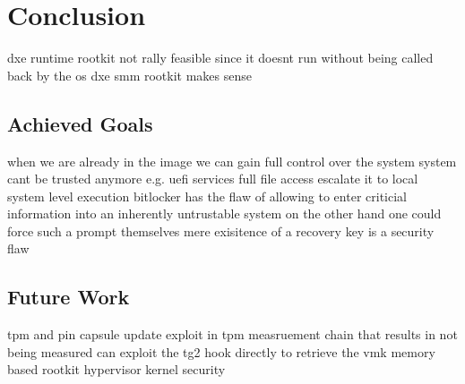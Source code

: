 
\chapter{Conclusion}

dxe runtime rootkit not rally feasible since it doesnt run without being called back by the os
dxe smm rootkit makes sense

\section{Achieved Goals}
when we are already in the image we can gain full control over the system
system cant be trusted anymore e.g. uefi services
full file access
escalate it to local system level execution
bitlocker has the flaw of allowing to enter criticial information into an inherently untrustable system
on the other hand one could force such a prompt themselves
mere exisitence of a recovery key is a security flaw

\section{Future Work}
tpm and pin
capsule update
exploit in tpm measruement chain that results in not being measured
can exploit the tg2 hook directly to retrieve the vmk
memory based rootkit
hypervisor kernel security